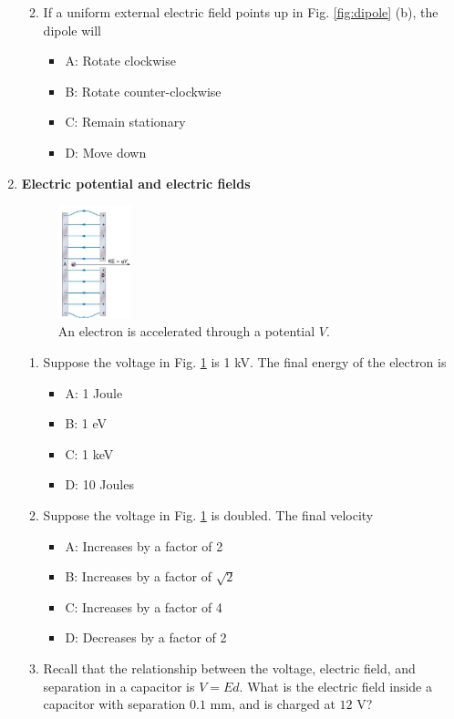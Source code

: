 \documentclass[10pt]{article}
\begin{document}
\begin{enumerate}
\begin{enumerate}
\begin{itemize}
\end{itemize}
\item If a uniform external electric field points up in Fig. \ref{fig:dipole} (b), the dipole will
\begin{itemize}
\item A: Rotate clockwise
\item B: Rotate counter-clockwise
\item C: Remain stationary
\item D: Move down
\end{itemize}
\end{enumerate}
\item \textbf{Electric potential and electric fields}
\begin{figure}[hb]
\centering
\includegraphics[width=0.2\textwidth]{figures/plate2.png}
\caption{\label{fig:plate2} An electron is accelerated through a potential $V$.}
\end{figure}
\begin{enumerate}
\item Suppose the voltage in Fig. \ref{fig:plate2} is 1 kV.  The final energy of the electron is
\begin{itemize}
\item A: 1 Joule
\item B: 1 eV
\item C: 1 keV
\item D: 10 Joules
\end{itemize}
\item Suppose the voltage in Fig. \ref{fig:plate2} is doubled.  The final velocity
\begin{itemize}
\item A: Increases by a factor of 2
\item B: Increases by a factor of $\sqrt{2}$
\item C: Increases by a factor of 4
\item D: Decreases by a factor of 2
\end{itemize}
\item Recall that the relationship between the voltage, electric field, and separation in a capacitor is $V = E d$.  What is the electric field inside a capacitor with separation $0.1$ mm, and is charged at $12$ V?

\end{enumerate}
\end{enumerate}
\end{document}
